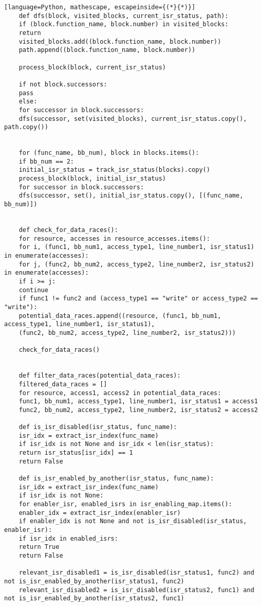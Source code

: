 \documentclass[
fancyheadings, %
%
%
]{stsreprt}
\begin{document}
\begin{lstlisting}[language=Python, mathescape, escapeinside={(*}{*)}]
	def dfs(block, visited_blocks, current_isr_status, path):
	if (block.function_name, block.number) in visited_blocks:
	return
	visited_blocks.add((block.function_name, block.number))
	path.append((block.function_name, block.number))
	
	process_block(block, current_isr_status)
	
	if not block.successors:
	pass
	else:
	for successor in block.successors:
	dfs(successor, set(visited_blocks), current_isr_status.copy(), path.copy())
	
	
	for (func_name, bb_num), block in blocks.items():
	if bb_num == 2:  
	initial_isr_status = track_isr_status(blocks).copy()
	process_block(block, initial_isr_status)
	for successor in block.successors:
	dfs(successor, set(), initial_isr_status.copy(), [(func_name, bb_num)])
	
	
	def check_for_data_races():
	for resource, accesses in resource_accesses.items():
	for i, (func1, bb_num1, access_type1, line_number1, isr_status1) in enumerate(accesses):
	for j, (func2, bb_num2, access_type2, line_number2, isr_status2) in enumerate(accesses):
	if i >= j:
	continue  
	if func1 != func2 and (access_type1 == "write" or access_type2 == "write"):
	potential_data_races.append((resource, (func1, bb_num1, access_type1, line_number1, isr_status1),
	(func2, bb_num2, access_type2, line_number2, isr_status2)))
	
	check_for_data_races()
	
	
	def filter_data_races(potential_data_races):
	filtered_data_races = []
	for resource, access1, access2 in potential_data_races:
	func1, bb_num1, access_type1, line_number1, isr_status1 = access1
	func2, bb_num2, access_type2, line_number2, isr_status2 = access2
	
	def is_isr_disabled(isr_status, func_name):
	isr_idx = extract_isr_index(func_name)
	if isr_idx is not None and isr_idx < len(isr_status):
	return isr_status[isr_idx] == 1
	return False
	
	def is_isr_enabled_by_another(isr_status, func_name):
	isr_idx = extract_isr_index(func_name)
	if isr_idx is not None:
	for enabler_isr, enabled_isrs in isr_enabling_map.items():
	enabler_idx = extract_isr_index(enabler_isr)
	if enabler_idx is not None and not is_isr_disabled(isr_status, enabler_isr):
	if isr_idx in enabled_isrs:
	return True
	return False
	
	relevant_isr_disabled1 = is_isr_disabled(isr_status1, func2) and not is_isr_enabled_by_another(isr_status1, func2)
	relevant_isr_disabled2 = is_isr_disabled(isr_status2, func1) and not is_isr_enabled_by_another(isr_status2, func1)
	

\end{lstlisting}
\end{document}
